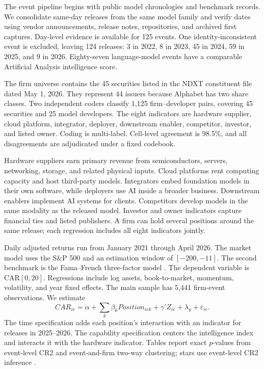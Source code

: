 \documentclass[review,12pt,authoryear]{elsarticle}
\begin{document}
The event pipeline begins with public model chronologies and benchmark
records. We consolidate same-day releases from the same model family and
verify dates using vendor announcements, release notes, repositories, and
archived first captures. Day-level evidence is available for 125 events.
One identity-inconsistent event is excluded, leaving 124 releases: 3 in
2022, 8 in 2023, 45 in 2024, 59 in 2025, and 9 in 2026. Eighty-seven
language-model events have a comparable Artificial Analysis intelligence
score.

The firm universe contains the 45 securities listed in the NDXT constituent
file dated May 1, 2026. They represent 44 issuers because Alphabet has two
share classes. Two independent coders classify 1,125 firm--developer pairs,
covering 45 securities and 25 model developers. The eight indicators are
hardware supplier, cloud platform, integrator, deployer, downstream enabler,
competitor, investor, and listed owner. Coding is multi-label. Cell-level
agreement is 98.5\%, and all disagreements are adjudicated under a fixed
codebook.

Hardware suppliers earn primary revenue from semiconductors, servers,
networking, storage, and related physical inputs. Cloud platforms rent
computing capacity and host third-party models. Integrators embed foundation
models in their own software, while deployers use AI inside a broader
business. Downstream enablers implement AI systems for clients. Competitors
develop models in the same modality as the released model. Investor and
owner indicators capture financial ties and listed publishers. A firm can
hold several positions around the same release; each regression includes all
eight indicators jointly.

Daily adjusted returns run from January 2021 through April 2026. The market
model uses the S\&P 500 and an estimation window of $[-200,-11]$.
The second benchmark is the Fama--French three-factor model
\citep{fama1993}. The dependent variable is CAR$[0,20]$. Regressions include
log assets, book-to-market, momentum, volatility, and year fixed effects.
The main sample has 5,441 firm-event observations. We estimate
\begin{equation}
 CAR_{ie}=\alpha+\sum_k\beta_k Position_{iek}
 +\gamma'Z_{ie}+\lambda_y+\varepsilon_{ie}.
\end{equation}
The time specification adds each position's interaction with an indicator
for releases in 2025--2026. The capability specification centers the
intelligence index and interacts it with the hardware indicator. Tables
report exact $p$-values from event-level CR2 and event-and-firm two-way
clustering; stars use event-level CR2 inference \citep{cameron2011}.
\end{document}

